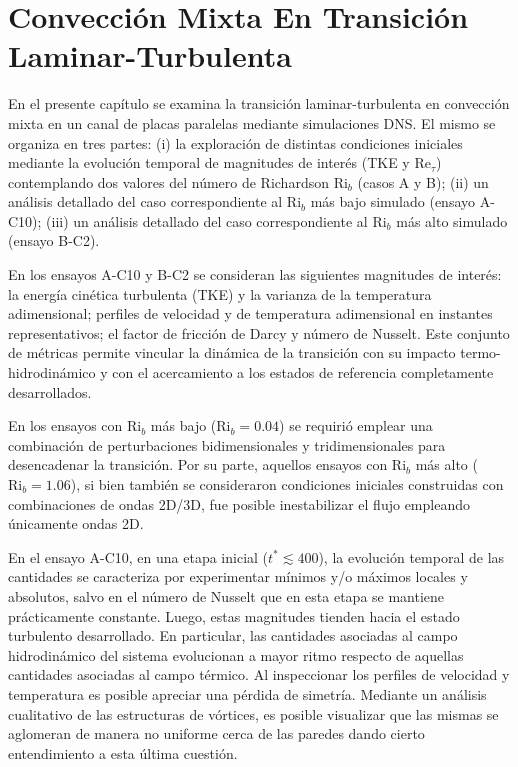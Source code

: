 \chapter{Convección Mixta En Transición Laminar-Turbulenta} \label{cap:transicion}

En el presente capítulo se examina la transición laminar-turbulenta en convección mixta en un canal de placas paralelas mediante simulaciones DNS. El mismo se organiza en tres partes: (i) la exploración de distintas condiciones iniciales mediante la evolución temporal de magnitudes de interés (TKE y Re$_{\tau}$) contemplando dos valores del número de Richardson Ri$_b$ (casos A y B); (ii) un análisis detallado del caso correspondiente al Ri$_b$ más bajo simulado (ensayo A-C10); (iii) un análisis detallado del caso correspondiente al Ri$_b$ más alto simulado (ensayo B-C2).

En los ensayos A-C10 y B-C2 se consideran las siguientes magnitudes de interés: la energía cinética turbulenta (TKE) y la varianza de la temperatura adimensional; perfiles de velocidad y de temperatura adimensional en instantes representativos; el factor de fricción de Darcy y número de Nusselt. Este conjunto de métricas permite vincular la dinámica de la transición con su impacto termo-hidrodinámico y con el acercamiento a los estados de referencia completamente desarrollados.

En los ensayos con Ri$_b$ más bajo ($\text{Ri}_b=0\text{.}04$) se requirió emplear una combinación de perturbaciones bidimensionales y tridimensionales para desencadenar la transición. Por su parte, aquellos ensayos con Ri$_b$ más alto ($\text{Ri}_b=1\text{.}06$), si bien también se consideraron condiciones iniciales construidas con combinaciones de ondas 2D/3D, fue posible inestabilizar el flujo empleando únicamente ondas 2D. 

En el ensayo A-C10, en una etapa inicial ($t^*\lesssim 400$), la evolución temporal de las \linebreak cantidades se caracteriza por experimentar mínimos y/o máximos locales y absolutos, \linebreak salvo en el número de Nusselt que en esta etapa se mantiene prácticamente constante. Luego, estas magnitudes tienden hacia el estado turbulento desarrollado. En particular, las cantidades asociadas al campo hidrodinámico del sistema evolucionan a mayor ritmo respecto de aquellas cantidades asociadas al campo térmico. Al inspeccionar los perfiles de velocidad y temperatura es posible apreciar una pérdida de simetría. Mediante un análisis cualitativo de las estructuras de vórtices, es posible visualizar que las mismas se aglomeran de manera no uniforme cerca de las paredes dando cierto entendimiento a esta última cuestión.  

